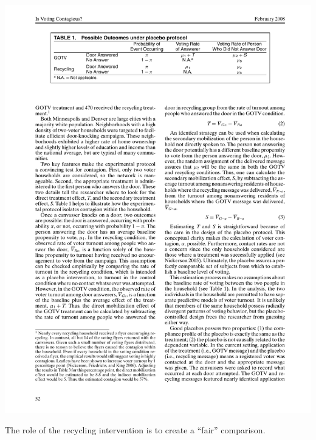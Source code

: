 \documentclass[aspectratio=169]{beamer}
\begin{document}
\begin{frame}

\begin{center}
\includegraphics[width=1\textwidth]{figures/nickerson_voting_2008_tab1}
\end{center}

\vfill

The role of the recycling intervention is to create a ``fair'' comparison.
\end{frame}
\end{document}
